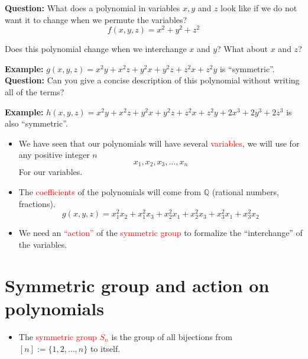 \documentclass[12pt]{memoir}
\begin{document}
\textbf{Question:} What does a polynomial in variables $x, y$ and $z$ look like if we do not want it to change when we permute the variables?
\[
f(x,y,z) = x^2 + y^2 + z^2
\]

Does this polynomial change when we interchange $x$ and $y$? What about $x$ and $z$?

\textbf{Example:} $g(x,y,z) = x^2 y + x^2 z + y^2 x + y^2 z + z^2 x + z^2 y$ is ``symmetric''.\\
\textbf{Question:} Can you give a concise description of this polynomial without writing all of the terms?

\textbf{Example:} $h(x,y,z) = x^2 y + x^2 z + y^2 x + y^2 z + z^2 x + z^2 y + 2x^3 + 2y^3 + 2z^3$ is also ``symmetric''.

\begin{itemize}[label=$\diamond$]
    \item We have seen that our polynomials will have several \textcolor{red}{variables}, we will use for any positive integer $n$
    \[
    x_1, x_2, x_3, \dots, x_n
    \]
    For our variables.
    \item The \textcolor{red}{coefficients} of the polynomials will come from $\mathbb{Q}$ (rational numbers, fractions).
    \[
    g(x,y,z) = x_1^2 x_2 + x_1^2 x_3 + x_2^2 x_1 + x_2^2 x_3 + x_3^2 x_1 + x_3^2 x_2
    \]
    \item We need an \textcolor{red}{``action''} of the \textcolor{red}{symmetric group} to formalize the ``interchange'' of the variables.
\end{itemize}

\newpage

\section{Symmetric group and action on polynomials}

\begin{itemize}[label=$\diamond$]
    \item The \textcolor{red}{symmetric group $S_n$} is the group of all bijections from $[n] := \{1,2,\dots,n\}$ to itself.
\end{itemize}
\end{document}
